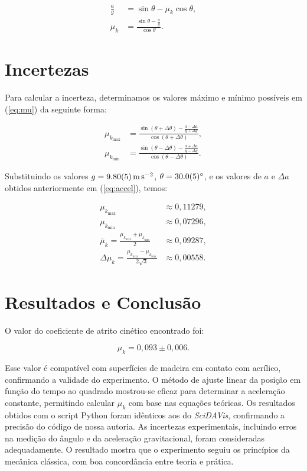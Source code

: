 \documentclass[10pt,oneside,twocolumn,a4paper]{article}
\begin{document}
\begin{align}\label{eq:mu}
	\frac{a}{g} &= \sin\theta - \mu_k \cos\theta, \nonumber \\
	\mu_k &= \frac{\sin\theta - \frac{a}{g}}{\cos\theta}.
\end{align}

\section{Incertezas}

Para calcular a incerteza, determinamos os valores máximo e mínimo possíveis em
(\ref{eq:mu}) da seguinte forma:

\begin{align*}
	\mu_{k_\text{max}} &= \frac{\sin(\theta + \Delta\theta) - \frac{a - \Delta a}{g + \Delta g}}{\cos(\theta + \Delta\theta)}, \\
	\mu_{k_\text{min}} &= \frac{\sin(\theta - \Delta\theta) - \frac{a + \Delta a}{g - \Delta g}}{\cos(\theta - \Delta\theta)}.
\end{align*}


Substituindo os valores $g = \SI{9.8 \pm 0.05}{\meter\per\second\squared}$,
$\theta = \SI{30 \pm 0.5}{\degree}$, e os valores de $a$ e $\Delta a$ obtidos
anteriormente em (\ref{eq:accel}), temos:

\begin{align*}
	\mu_{k_\text{max}} &\approx 0,11279, \\
	\mu_{k_\text{min}} &\approx 0,07296, \\
	\overline\mu_k = \frac{\mu_{k_\text{max}} + \mu_{k_\text{min}}}{2} &\approx 0,09287, \\
	\Delta\mu_k = \frac{\mu_{k_\text{max}} - \mu_{k_\text{min}}}{2\sqrt{3}} &\approx 0,00558.
\end{align*}

\section{Resultados e Conclusão}

O valor do coeficiente de atrito cinético encontrado foi:

\begin{equation*}
	\mu_k = 0,093 \pm 0,006.
\end{equation*}

Esse valor é compatível com superfícies de madeira em contato com acrílico,
confirmando a validade do experimento. O método de ajuste linear da posição em
função do tempo ao quadrado mostrou-se eficaz para determinar a aceleração
constante, permitindo calcular $\mu_k$ com base nas equações teóricas. Os
resultados obtidos com o script Python foram idênticos aos do
\textit{SciDAVis}, confirmando a precisão do código de nossa autoria. As
incertezas experimentais, incluindo erros na medição do ângulo e da aceleração
gravitacional, foram consideradas adequadamente. O resultado mostra que o
experimento seguiu os princípios da mecânica clássica, com boa concordância
entre teoria e prática.
\end{document}
